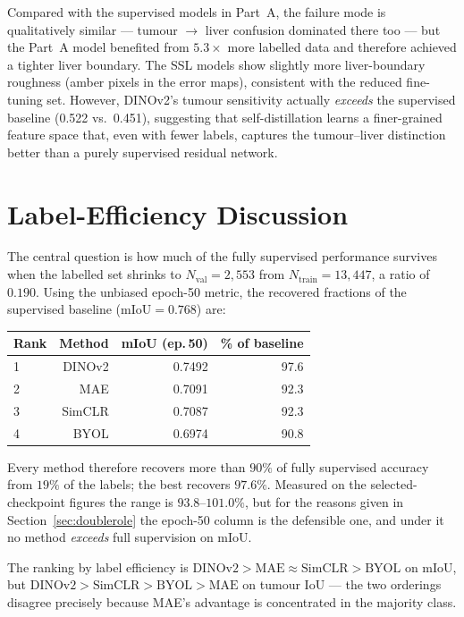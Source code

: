 \documentclass[conference]{IEEEtran}
\begin{document}
Compared with the supervised models in Part~A, the failure mode is
qualitatively similar --- tumour $\rightarrow$ liver confusion dominated there
too --- but the Part~A model benefited from $5.3\times$ more labelled data and
therefore achieved a tighter liver boundary. The SSL models show slightly more
liver-boundary roughness (amber pixels in the error maps), consistent with
the reduced fine-tuning set. However, DINOv2's tumour sensitivity actually
\emph{exceeds} the supervised baseline (0.522 vs.\ 0.451), suggesting that
self-distillation learns a finer-grained feature space that, even with fewer
labels, captures the tumour--liver distinction better than a purely supervised
residual network.

\section{Label-Efficiency Discussion}

The central question is how much of the fully supervised performance survives when
the labelled set shrinks to $N_{\text{val}}=2{,}553$ from
$N_{\text{train}}=13{,}447$, a ratio of $0.190$. Using the unbiased epoch-50
metric, the recovered fractions of the supervised baseline
($\text{mIoU}=0.768$) are:

\begin{table}[h]
\centering
\small
\begin{tabular}{lrrr}
\toprule
Rank & Method & mIoU (ep.\,50) & \% of baseline\\
\midrule
1 & DINOv2 & 0.7492 & 97.6\\
2 & MAE    & 0.7091 & 92.3\\
3 & SimCLR & 0.7087 & 92.3\\
4 & BYOL   & 0.6974 & 90.8\\
\bottomrule
\end{tabular}
\end{table}

Every method therefore recovers more than $90\%$ of fully supervised accuracy from
$19\%$ of the labels; the best recovers $97.6\%$. Measured on the
selected-checkpoint figures the range is $93.8$--$101.0\%$, but for the reasons
given in Section~\ref{sec:doublerole} the epoch-50 column is the defensible one,
and under it no method \emph{exceeds} full supervision on mIoU.

The ranking by label efficiency is
$\text{DINOv2}>\text{MAE}\approx\text{SimCLR}>\text{BYOL}$ on mIoU, but
$\text{DINOv2}>\text{SimCLR}>\text{BYOL}>\text{MAE}$ on tumour IoU --- the two
orderings disagree precisely because MAE's advantage is concentrated in the
majority class.
\end{document}
